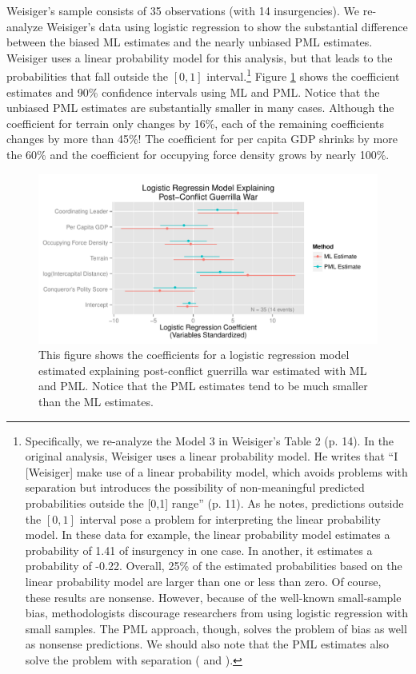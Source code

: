 \documentclass[12pt]{article}
\begin{document}
Weisiger's sample consists of 35 observations (with 14 insurgencies). 
We re-analyze Weisiger's data using logistic regression to show the substantial difference between the biased ML estimates and the nearly unbiased PML estimates. Weisiger uses a linear probability model for this analysis, but that leads to the probabilities that fall outside the $[0, 1]$ interval.\footnote{Specifically, we re-analyze the Model 3 in Weisiger's Table 2 (p. 14). 
In the original analysis, Weisiger uses a linear probability model. 
He writes that ``I [Weisiger] make use of a linear probability model, which avoids problems with separation but introduces the possibility of non-meaningful predicted probabilities outside the [0,1] range'' (p. 11).
As he notes, predictions outside the $[0, 1]$ interval pose a problem for interpreting the linear probability model. 
In these data for example, the linear probability model estimates a probability of 1.41 of insurgency in one case. 
In another, it estimates a probability of -0.22. 
Overall, 25\% of the estimated probabilities based on the linear probability model are larger than one or less than zero.
Of course, these results are nonsense. 
However, because of the well-known small-sample bias, methodologists discourage researchers from using logistic regression with small samples.
The PML approach, though, solves the problem of bias as well as nonsense predictions.
We should also note that the PML estimates also solve the problem with separation (\citealt{Zorn2005} and \citealt{Rainey-separation}).} 
Figure \ref{fig:weisiger-coefs} shows the coefficient estimates and 90\% confidence intervals using ML and PML. 
Notice that the unbiased PML estimates are substantially smaller in many cases.
Although the coefficient for terrain only changes by 16\%, each of the remaining coefficients changes by more than 45\%! 
The coefficient for per capita GDP shrinks by more the 60\% and the coefficient for occupying force density grows by nearly 100\%.

\begin{figure}[h]
\begin{center}
\includegraphics[width = \textwidth]{figs/weisiger-coefs.pdf}
\caption{This figure shows the coefficients for a logistic regression model estimated explaining post-conflict guerrilla war estimated with ML and PML. 
Notice that the PML estimates tend to be much smaller than the ML estimates.}\label{fig:weisiger-coefs}
\end{center}
\end{figure}
\end{document}
